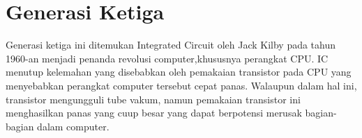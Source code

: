 \section{Generasi Ketiga}
  Generasi ketiga ini ditemukan Integrated Circuit oleh Jack Kilby pada tahun 1960-an menjadi penanda revolusi computer,khususnya perangkat CPU. IC menutup kelemahan yang disebabkan oleh pemakaian transistor pada CPU yang menyebabkan perangkat computer tersebut cepat panas.
  Walaupun dalam hal ini, transistor mengungguli tube vakum, namun pemakaian transistor ini menghasilkan panas yang cuup besar yang dapat berpotensi merusak bagian-bagian dalam computer.
   
